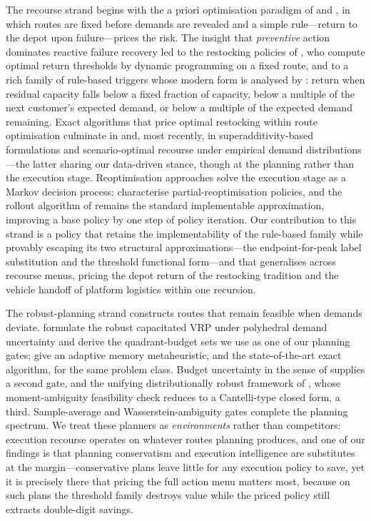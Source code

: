 \documentclass[preprint,authoryear,12pt]{elsarticle}
\theoremstyle{definition}
\theoremstyle{remark}
\begin{document}
The recourse strand begins with the a priori optimisation paradigm of
\citet{bertsimas1992vehicle} and \citet{dror1989vehicle}, in which
routes are fixed before demands are revealed and a simple rule---return
to the depot upon failure---prices the risk. The insight that
\emph{preventive} action dominates reactive failure recovery led to the
restocking policies of \citet{yang2000stochastic}, who compute optimal
return thresholds by dynamic programming on a fixed route, and to a rich
family of rule-based triggers whose modern form is analysed by
\citet{salavati2019rule}: return when residual capacity falls below a
fixed fraction of capacity, below a multiple of the next customer's
expected demand, or below a multiple of the expected demand remaining.
Exact algorithms that price optimal restocking within route optimisation
culminate in \citet{florio2020new} and, most recently, in
superadditivity-based formulations \citep{legault2025superadditivity}
and scenario-optimal recourse under empirical demand distributions
\citep{ota2026scenario}---the latter sharing our data-driven stance,
though at the planning rather than the execution stage. Reoptimisation
approaches solve the execution stage as a Markov decision process:
\citet{secomandi2009reoptimization} characterise partial-reoptimisation
policies, and the rollout algorithm of \citet{secomandi2001rollout}
remains the standard implementable approximation, improving a base
policy by one step of policy iteration. Our contribution to this strand
is a policy that retains the implementability of the rule-based family
while provably escaping its two structural approximations---the
endpoint-for-peak label substitution and the threshold functional
form---and that generalises across recourse menus, pricing the depot
return of the restocking tradition and the vehicle handoff of platform
logistics within one recursion.

The robust-planning strand constructs routes that remain feasible when
demands deviate. \citet{gounaris2013robust} formulate the robust
capacitated VRP under polyhedral demand uncertainty and derive the
quadrant-budget sets we use as one of our planning gates;
\citet{gounaris2016adaptive} give an adaptive memory metaheuristic, and
\citet{pessoa2021branch} the state-of-the-art exact algorithm, for the
same problem class. Budget uncertainty in the sense of
\citet{bertsimas2004price} supplies a second gate, and the unifying
distributionally robust framework of \citet{ghosal2024unifying}, whose
moment-ambiguity feasibility check reduces to a Cantelli-type closed
form, a third. Sample-average and Wasserstein-ambiguity gates
\citep{esfahani2018data} complete the planning spectrum. We treat these
planners as \emph{environments} rather than competitors: execution
recourse operates on whatever routes planning produces, and one of our
findings is that planning conservatism and execution intelligence are
substitutes at the margin---conservative plans leave little for any
execution policy to save, yet it is precisely there that pricing the
full action menu matters most, because on such plans the threshold
family destroys value while the priced policy still extracts double-digit
savings.
\end{document}

